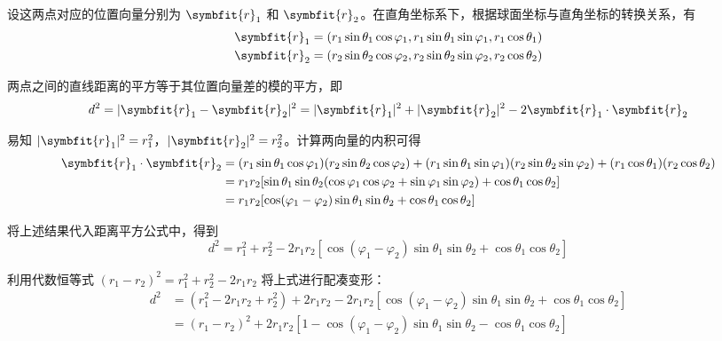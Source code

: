 \begin{myproof}
    设这两点对应的位置向量分别为 $\symbfit{r}_1$ 和 $\symbfit{r}_2$。在直角坐标系下，根据球面坐标与直角坐标的转换关系，有
    \begin{equation*}
        \begin{aligned}
            \symbfit{r}_1 & = (r_1 \sin\theta_1 \cos\varphi_1, r_1 \sin\theta_1 \sin\varphi_1, r_1 \cos\theta_1) \\
            \symbfit{r}_2 & = (r_2 \sin\theta_2 \cos\varphi_2, r_2 \sin\theta_2 \sin\varphi_2, r_2 \cos\theta_2)
        \end{aligned}
    \end{equation*}

    两点之间的直线距离的平方等于其位置向量差的模的平方，即
    \begin{equation*}
        d^2 = |\symbfit{r}_1 - \symbfit{r}_2|^2 = |\symbfit{r}_1|^2 + |\symbfit{r}_2|^2 - 2 \symbfit{r}_1 \cdot \symbfit{r}_2
    \end{equation*}

    易知 $|\symbfit{r}_1|^2 = r_1^2$，$|\symbfit{r}_2|^2 = r_2^2$。计算两向量的内积可得
    \begin{equation*}
        \begin{aligned}
            \symbfit{r}_1 \cdot \symbfit{r}_2 & = (r_1 \sin\theta_1 \cos\varphi_1)(r_2 \sin\theta_2 \cos\varphi_2) + (r_1 \sin\theta_1 \sin\varphi_1)(r_2 \sin\theta_2 \sin\varphi_2) + (r_1 \cos\theta_1)(r_2 \cos\theta_2) \\
                                              & = r_1 r_2 [\sin\theta_1 \sin\theta_2 (\cos\varphi_1 \cos\varphi_2 + \sin\varphi_1 \sin\varphi_2) + \cos\theta_1 \cos\theta_2]                                                \\
                                              & = r_1 r_2 [\cos(\varphi_1 - \varphi_2) \sin\theta_1 \sin\theta_2 + \cos\theta_1 \cos\theta_2]
        \end{aligned}
    \end{equation*}

    将上述结果代入距离平方公式中，得到
    \begin{equation*}
        d^2 = r_1^2 + r_2^2 - 2r_1 r_2 [\cos(\varphi_1 - \varphi_2) \sin\theta_1 \sin\theta_2 + \cos\theta_1 \cos\theta_2]
    \end{equation*}

    利用代数恒等式 $(r_1 - r_2)^2 = r_1^2 + r_2^2 - 2r_1 r_2$ 将上式进行配凑变形：
    \begin{equation*}
        \begin{aligned}
            d^2 & = (r_1^2 - 2r_1 r_2 + r_2^2) + 2r_1 r_2 - 2r_1 r_2 [\cos(\varphi_1 - \varphi_2) \sin\theta_1 \sin\theta_2 + \cos\theta_1 \cos\theta_2] \\
                & = (r_1 - r_2)^2 + 2r_1 r_2 [1 - \cos(\varphi_1 - \varphi_2) \sin\theta_1 \sin\theta_2 - \cos\theta_1 \cos\theta_2]
        \end{aligned}
    \end{equation*}


\end{myproof}
